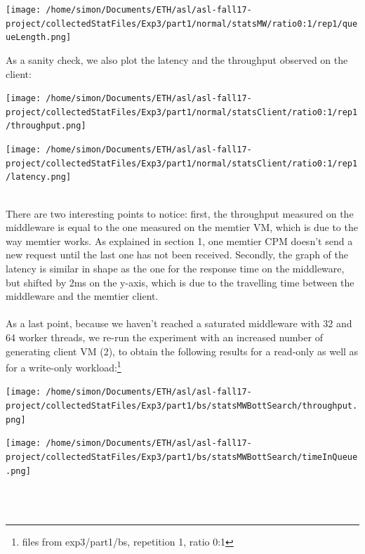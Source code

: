 \documentclass[11pt,a4paper]{article}
\begin{document}
\begin{center}
\texttt{[image: /home/simon/Documents/ETH/asl/asl-fall17-project/collectedStatFiles/Exp3/part1/normal/statsMW/ratio0:1/rep1/queueLength.png]}
\end{center}
As a sanity check, we also plot the latency and the throughput observed on the client:
\\
\begin{minipage}{0.5\linewidth}
\texttt{[image: /home/simon/Documents/ETH/asl/asl-fall17-project/collectedStatFiles/Exp3/part1/normal/statsClient/ratio0:1/rep1/throughput.png]}
\end{minipage}
\hfill
\begin{minipage}{0.5\linewidth}
\texttt{[image: /home/simon/Documents/ETH/asl/asl-fall17-project/collectedStatFiles/Exp3/part1/normal/statsClient/ratio0:1/rep1/latency.png]}
\end{minipage}
\\
There are two interesting points to notice: first, the throughput measured on the middleware is equal to the one measured on the memtier VM, which is due to the way memtier works. As explained in section 1, one memtier CPM doesn't send a new request until the last one has not been received. Secondly, the graph of the latency is similar in shape as the one for the response time on the middleware, but shifted by 2ms on the y-axis, which is due to the travelling time between the middleware and the memtier client. 
\\
\\
As a last point, because we haven't reached a saturated middleware with 32 and 64 worker threads, we re-run the experiment with an increased number of generating client VM (2), to obtain the following results for a read-only as well as for a write-only workload:\footnote{files from exp3/part1/bs, repetition 1, ratio 0:1}
\\
\begin{minipage}{0.48\linewidth}
\texttt{[image: /home/simon/Documents/ETH/asl/asl-fall17-project/collectedStatFiles/Exp3/part1/bs/statsMWBottSearch/throughput.png]}
\end{minipage}
\hfill
\begin{minipage}{0.48\linewidth}
\texttt{[image: /home/simon/Documents/ETH/asl/asl-fall17-project/collectedStatFiles/Exp3/part1/bs/statsMWBottSearch/timeInQueue.png]}
\end{minipage}
\\\\
\end{document}
